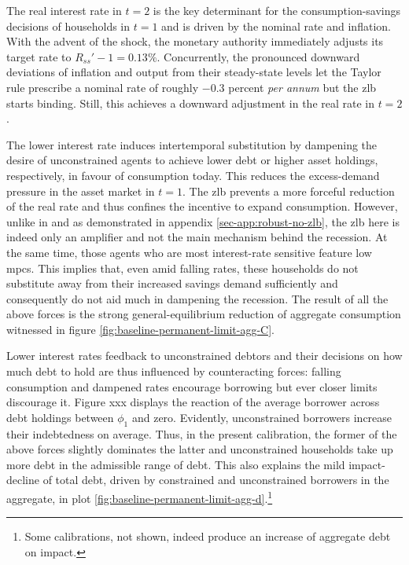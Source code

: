 \documentclass[a4paper,12pt]{article} %
\numberwithin{equation}{section} %
\numberwithin{figure}{section}
\numberwithin{table}{section}
\begin{document}
The real interest rate in $t=2$ is the key determinant for the consumption-savings decisions of households in $t=1$ and is driven by the nominal rate and inflation. With the advent of the shock, the monetary authority immediately adjusts its target rate to $R_{ss}' - 1 = 0.13\%$. Concurrently, the pronounced downward deviations of inflation and output from their steady-state levels let the Taylor rule prescribe a nominal rate of roughly $-0.3$ percent \textit{per annum} but the \Gls{zlb} starts binding. Still, this achieves a downward adjustment in the real rate in $t=2$. 

The lower interest rate induces intertemporal substitution by dampening the desire of unconstrained agents to achieve lower debt or higher asset holdings, respectively, in favour of consumption today. This reduces the excess-demand pressure in the asset market in $t=1$. The \Gls{zlb} prevents a more forceful reduction of the real rate and thus confines the incentive to expand consumption. However, unlike in \textcite{egg2012} and as demonstrated in appendix \ref{sec-app:robust-no-zlb}, the \Gls{zlb} here is indeed only an amplifier and not the main mechanism behind the recession. At the same time, those agents who are most interest-rate sensitive feature low \Gls{mpc}s. This implies that, even amid falling rates, these households do not substitute away from their increased savings demand sufficiently and consequently do not aid much in dampening the recession. The result of all the above forces is the strong general-equilibrium reduction of aggregate consumption witnessed in figure \ref{fig:baseline-permanent-limit-agg-C}.

Lower interest rates feedback to unconstrained debtors and their decisions on how much debt to hold are thus influenced by counteracting forces: falling consumption and dampened rates encourage borrowing but ever closer limits discourage it. Figure xxx displays the reaction of the average borrower across debt holdings between $\phi_1$ and zero. Evidently, unconstrained borrowers increase their indebtedness on average. Thus, in the present calibration, the former of the above forces slightly dominates the latter and unconstrained households take up more debt in the admissible range of debt. This also explains the mild impact-decline of total debt, driven by constrained and unconstrained borrowers in the aggregate, in plot \ref{fig:baseline-permanent-limit-agg-d}.\footnote{Some calibrations, not shown, indeed produce an increase of aggregate debt on impact.}
\end{document}
